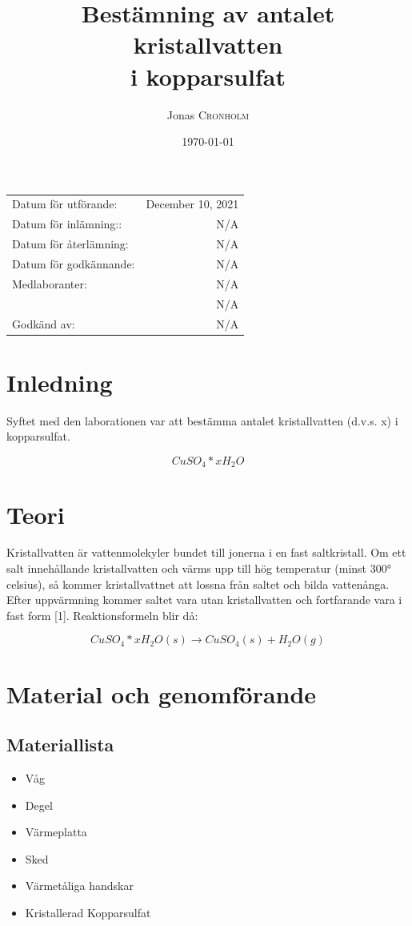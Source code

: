 \documentclass{article}
\title{Bestämning av antalet kristallvatten \\i kopparsulfat} %
\author{Jonas \textsc{Cronholm}} %
\date{\today} %
\begin{document}
	
	\maketitle %
	
	\begin{center}
		\begin{tabular}{l r}
			Datum för utförande: & December 10, 2021 \\ %
			Datum för inlämning:: & N/A \\
			Datum för återlämning: & N/A \\
			Datum för godkännande: & N/A \\
			Medlaboranter: & N/A \\ %
			& N/A \\
			Godkänd av: &  N/A%
		\end{tabular}
	\end{center}
	\pagebreak
	
	\section{Inledning}
	Syftet med den laborationen var att bestämma antalet kristallvatten (d.v.s. x) i kopparsulfat.
	
	\[CuSO_4 * xH_2O \]
	\section{Teori}
	Kristallvatten är vattenmolekyler bundet till jonerna i en fast saltkristall. Om ett salt innehållande kristallvatten och värms upp till hög temperatur (minst 300° celsius), så kommer kristallvattnet att lossna från saltet och bilda vattenånga. Efter uppvärmning kommer saltet vara utan kristallvatten och fortfarande vara i fast form [1]. Reaktionsformeln blir då:
	
	\[CuSO_4 * xH_2O(s) \longrightarrow CuSO_4(s) + H_2O(g) \]
	\section{Material och genomförande}
	\subsection{Materiallista}
	\begin{itemize}
		\item Våg
		\item Degel
		\item Värmeplatta
		\item Sked
		\item Värmetåliga handskar
		\item Kristallerad Kopparsulfat 
	\end{itemize}
\pagebreak
\end{document}
